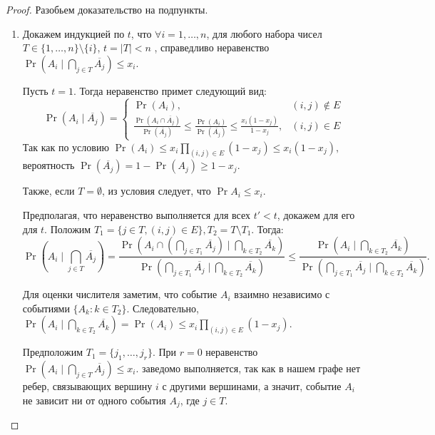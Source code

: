 \begin{proof}
	Разобьем доказательство на подпункты.
	\begin{enumerate} 		
		\item 
		Докажем индукцией по $ t $, что \(\forall i = 1, \ldots, n \), для любого набора чисел \(T \in \{1, \ldots, n\} \setminus \{i\} \), \(t = \left|T\right| < n\) , справедливо неравенство 
		\(
		\Pr(A_i\mid\bigcap\limits_{j \in T}\overline{A_j}) \leq x_i. 
		\)
		
		Пусть $ t = 1 $. Тогда неравенство примет следующий вид:
		\[
		\Pr(A_i\mid\overline{A_j}) =
		\begin{cases}
		\Pr(A_i),& (i, j) \notin E \\
		\frac{\Pr(A_i \cap \overline{A_j})}{\Pr(\overline{A_j})} \leq \frac{\Pr(A_i)}{\Pr(\overline{A_j})} \leq \frac{x_i(1-x_j)}{1 - x_j},& (i, j) \in E
		\end{cases}
		\]
		Так как по условию \(\Pr(A_i) \leq x_i \prod\limits_{(i, j) \in E}(1 - x_j) \leq x_i (1 - x_j),\) вероятность \( \Pr(\overline{A_j}) = 1 - \Pr(A_j) \geq 1 - x_j.\) 
		
		Также, если \(T = \emptyset\), из условия следует, что \(\Pr{A_i} \leq x_i\).
		
		Предполагая, что неравенство выполняется для всех $ t' < t $, докажем для его для $ t $. Положим \(T_1 = \{j \in T, (i, j) \in E \}, T_2 = T \setminus T_1 \). Тогда:
		\[
		\Pr\left(A_i\mid \bigcap\limits_{j \in T}\overline{A_j}\right) = \frac
		{\Pr\left(A_i \cap(\bigcap\limits_{j \in T_1}\overline{A_j})\mid \bigcap\limits_{k \in T_2} \overline{A_k}\right)}
		{\Pr\left(\bigcap\limits_{j \in T_1}\overline{A_j}\mid\bigcap\limits_{k \in T_2}\overline{A_k}\right)}
		\leq
		\frac
		{\Pr\left(A_i\mid\bigcap\limits_{k \in T_2} \overline{A_k}\right)}
		{\Pr\left(\bigcap\limits_{j \in T_1} \overline{A_j}\mid\bigcap\limits_{k \in T_2} \overline{A_k}\right)}. 
		\]
		
		Для оценки числителя заметим, что событие $ A_i $ взаимно независимо с событиями \(\{A_k : k \in T_2\}\). Следовательно, 
		\(
		\Pr\left(A_i\mid\bigcap\limits_{k \in T_2} \overline{A_k}\right) = \Pr(A_i) \leq
		x_i \prod\limits_{(i, j) \in E}(1 - x_j).
		\)
		
		Предположим $ T_1 = \{j_1, \ldots, j_r \} $. При $ r = 0 $ неравенство 	\(
		\Pr\left(A_i\mid\bigcap\limits_{j \in T}\overline{A_j}\right) \leq x_i. 
		\) заведомо выполняется, так как в нашем графе нет ребер, связывающих вершину $ i $ с другими вершинами, а значит, событие $ A_i $ не зависит ни от одного события $ A_j $, где $ j \in T $.
		

\end{enumerate}
\end{proof}
